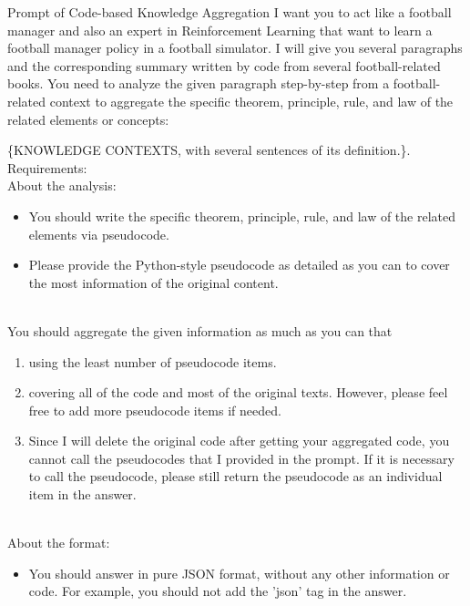 \begin{gbox}{Prompt of Code-based Knowledge Aggregation}
I want you to act like a football manager and also an expert in Reinforcement Learning that want to learn a football manager policy in a football simulator. I will give you several paragraphs and the corresponding summary written by code from several football-related books. You need to analyze the given paragraph step-by-step from a football-related context to aggregate the specific theorem, principle, rule, and law of the related elements or concepts: 

\hspace{10mm} \{KNOWLEDGE CONTEXTS, with several sentences of its definition.\}.
~\\

Requirements:
~\\

About the analysis:
\begin{itemize}
    \item You should write the specific theorem, principle, rule, and law of the related elements via pseudocode.
    \item Please provide the Python-style pseudocode as detailed as you can to cover the most information of the original content.
\end{itemize}
~\\

You should aggregate the given information as much as you can that 
\begin{enumerate}
    \item using the least number of pseudocode items.
    \item covering all of the code and most of the original texts. However, please feel free to add more pseudocode items if needed.
    \item Since I will delete the original code after getting your aggregated code, you cannot call the pseudocodes that I provided in the prompt. If it is necessary to call the pseudocode, please still return the pseudocode as an individual item in the answer.
\end{enumerate}
~\\

About the format:
\begin{itemize}
    \item You should answer in pure JSON format, without any other information or code. For example, you should not add the 'json' tag in the answer.
\end{itemize}
~\\


\end{gbox}
